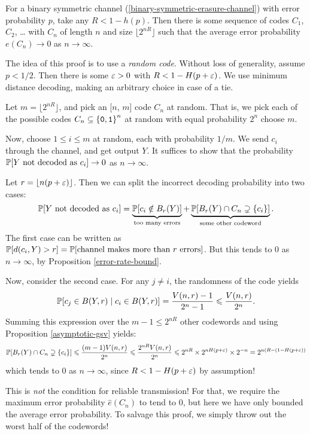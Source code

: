 \documentclass{article}
\begin{document}
\begin{proposition}
    For a binary symmetric channel (\ref{binary-symmetric-erasure-channel})
    with error probability $p$, take any $R < 1 - h(p)$.
    Then there is some sequence of codes $C_1$, $C_2$, \dots
    with $C_n$ of length $n$ and size $\lfloor 2^{nR} \rfloor$
    such that the average error probability $e(C_n) \to 0$ as $n \to \infty$.
\end{proposition}
\begin{prf}
    The idea of this proof is to use a \textit{random code}.
    Without loss of generality, assume $p < 1/2$.
    Then there is some $\eps > 0$ with $R < 1 - H(p + \eps)$.
    We use minimum distance decoding, making an arbitrary choice in case of a tie.
    
    Let $m = \lfloor 2^{nR} \rfloor$,
    and pick an [$n$, $m$] code $C_n$ at random.
    That is, we pick each of the possible codes $C_n \subs \binset^n$ at random
    with equal probability $2^n$ choose $m$.
    
    Now, choose $1 \leq i \leq m$ at random, each with probability $1/m$.
    We send $c_i$ through the channel, and get output $Y$.
    It suffices to show that the probability
    $\P[Y \text{ not decoded as } c_i] \to 0$ as $n \to \infty$.
    
    Let $r = \floor{n(p+\eps)}$.
    Then we can split the incorrect decoding probability into two cases:
    \[
	\P[Y \text{ not decoded as } c_i] =
	\underbrace{\P[c_i \notin B_r(Y)]}_{\text{too many errors}} +
	\underbrace{\P[B_r(Y) \cap C_n \supsetneq \set{c_i}]}_
	{\text{some other codeword}}.
	\]
	The first case can be written as
	$\P[d(c_i, Y) > r] = \P[\text{channel makes more than } r \text{ errors}]$.
	But this tends to 0 as $n \to \infty$, by Proposition \ref{error-rate-bound}.
	
	Now, consider the second case.
	For any $j \neq i$, the randomness of the code yields
	\[
	\P[c_j \in B(Y, r) \mid c_i \in B(Y, r)] =
	\frac{V(n, r)-1}{2^n-1} \leq
	\frac{V(n, r)}{2^n}.
	\]
	Summing this expression over the $m-1 \leq 2^{nR}$ other codewords
	and using Proposition \ref{asymptotic-gsv} yields:
	\[
	\P[B_r(Y) \cap C_n \supsetneq \set{c_i}] \leq
	\frac{(m-1) V(n,r)}{2^n} \leq
	\frac{2^{nR} V(n,r)}{2^n} \leq
	2^{nR} \times 2^{nH(p + \eps)} \times 2^{-n}
	= 2^{n(R - (1-H(p + \eps))}
	\]
	which tends to 0 as $n \to \infty$, since $R < 1-H(p + \eps)$ by assumption!
\end{prf}

\begin{note}
	This is \textit{not} the condition for reliable transmission!
	For that, we require the maximum error probability $\hat e(C_n)$ to tend to 0,
	but here we have only bounded the average error probability.
	To salvage this proof, we simply throw out the worst half of the codewords!
\end{note}
\end{document}
